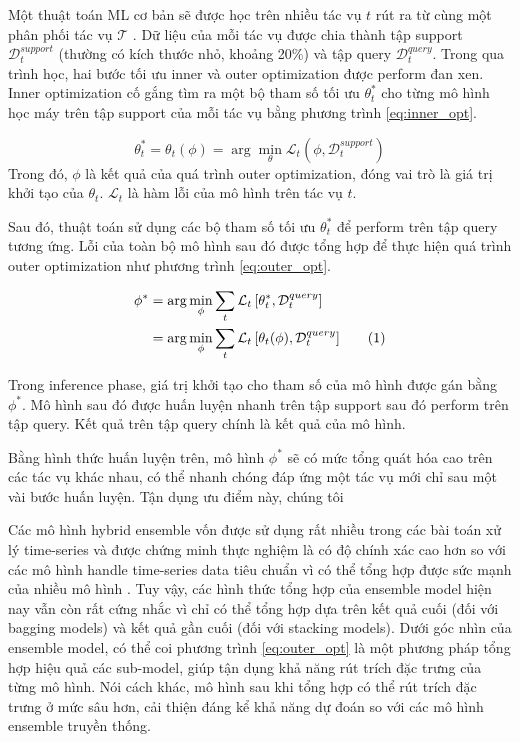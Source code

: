 \documentclass[aps,prb,groupedaddress,twocolumn,showpacs,dvipdfmx, superscriptaddress,pdftex]{revtex4-2}
\newcommand\numberthis{\addtocounter{equation}{1}\tag{\theequation}}
\begin{document}
Một thuật toán ML cơ bản sẽ được học trên nhiều tác vụ $t$ rút ra từ cùng một phân phối tác vụ $\mathcal{T}$ \cite{hospedales2021meta}. Dữ liệu của mỗi tác vụ được chia thành tập support $\mathcal{D}_t^{support}$ (thường có kích thước nhỏ, khoảng 20\%) và tập query $\mathcal{D}_t^{query}$. Trong qua trình học, hai bước tối ưu inner và outer optimization được perform đan xen. Inner optimization cố gắng tìm ra một bộ tham số tối ưu $\theta_t^*$ cho từng mô hình học máy trên tập support của mỗi tác vụ bằng phương trình \ref{eq:inner_opt}.

\begin{equation}
  \theta_t^* = \theta_t(\phi) = \arg\min_{\theta}{\mathcal{L}_t\left( \phi, \mathcal{D}_t^{support} \right)}
  \label{eq:inner_opt}
\end{equation} Trong đó, $\phi$ là kết quả của quá trình outer optimization, đóng vai trò là giá trị khởi tạo của $\theta_t$. $\mathcal{L}_t$ là hàm lỗi của mô hình trên tác vụ $t$.

\vspace{2mm}

Sau đó, thuật toán sử dụng các bộ tham số tối ưu $\theta_t^*$ để perform trên tập query tương ứng. Lỗi của toàn bộ mô hình sau đó được tổng hợp để thực hiện quá trình outer optimization như phương trình \ref{eq:outer_opt}.

\begin{align*}
  \phi^* &= \arg\min_{\phi}\sum_{t}{\mathcal{L}_t\left[ \theta_t^*, \mathcal{D}_t^{query} \right]}\\
  &= \arg\min_{\phi}\sum_{t}{\mathcal{L}_t\left[ \theta_t(\phi), \mathcal{D}_t^{query} \right]} \numberthis
  \label{eq:outer_opt}
\end{align*}

Trong inference phase, giá trị khởi tạo cho tham số của mô hình được gán bằng $\phi^*$. Mô hình sau đó được huấn luyện nhanh trên tập support sau đó perform trên tập query. Kết quả trên tập query chính là kết quả của mô hình.

\vspace{2mm}

Bằng hình thức huấn luyện trên, mô hình $\phi^*$ sẽ có mức tổng quát hóa cao trên các tác vụ khác nhau, có thể nhanh chóng đáp ứng một tác vụ mới chỉ sau một vài bước huấn luyện. Tận dụng ưu điểm này, chúng tôi 

\vspace{2mm}

Các mô hình hybrid ensemble vốn được sử dụng rất nhiều trong các bài toán xử lý time-series và được chứng minh thực nghiệm là có độ chính xác cao hơn so với các mô hình handle time-series data tiêu chuẩn vì có thể tổng hợp được sức mạnh của nhiều mô hình \cite{ayitey2023forex}. Tuy vậy, các hình thức tổng hợp của ensemble model hiện nay vẫn còn rất cứng nhắc vì chỉ có thể tổng hợp dựa trên kết quả cuối (đối với bagging models) và kết quả gần cuối (đối với stacking models). Dưới góc nhìn của ensemble model, có thể coi phương trình \ref{eq:outer_opt} là một phương pháp tổng hợp hiệu quả các sub-model, giúp tận dụng khả năng rút trích đặc trưng của từng mô hình. Nói cách khác, mô hình sau khi tổng hợp có thể rút trích đặc trưng ở mức sâu hơn, cải thiện đáng kể khả năng dự đoán so với các mô hình ensemble truyền thống.
\end{document}

